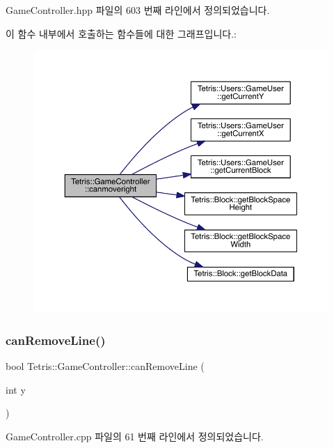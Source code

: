 Game\+Controller.\+hpp 파일의 603 번째 라인에서 정의되었습니다.

이 함수 내부에서 호출하는 함수들에 대한 그래프입니다.\+:
\nopagebreak
\begin{figure}[H]
\begin{center}
\leavevmode
\includegraphics[width=350pt]{class_tetris_1_1_game_controller_a6c8189bb893502049396a7de1a73a88c_cgraph}
\end{center}
\end{figure}
\mbox{\label{class_tetris_1_1_game_controller_a912bb473994e869a610ab356086cb0ad}} 
\subsubsection{\texorpdfstring{can\+Remove\+Line()}{canRemoveLine()}\hspace{0.1cm}{\footnotesize\ttfamily [1/2]}}
{\footnotesize\ttfamily bool Tetris\+::\+Game\+Controller\+::can\+Remove\+Line (\begin{DoxyParamCaption}\item[{int}]{y }\end{DoxyParamCaption})}



Game\+Controller.\+cpp 파일의 61 번째 라인에서 정의되었습니다.

